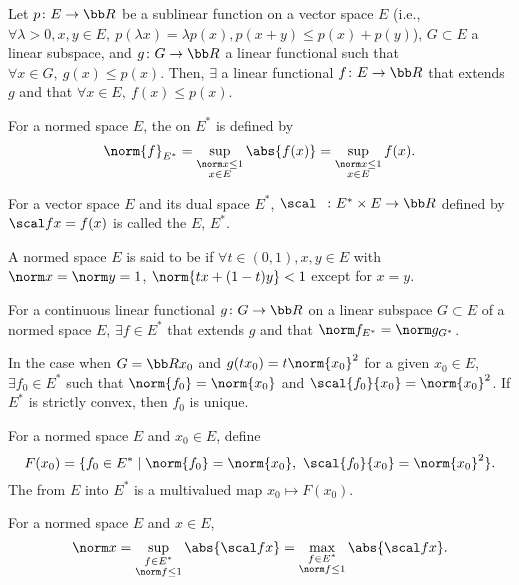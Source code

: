 \cite{brezis}
Let $p \colon E \to \bb R$ be a sublinear function on a vector space $E$ (i.e., $\forall \lambda > 0, x, y \in E,\ p(\lambda x) = \lambda p(x), p(x+y) \le p(x) + p(y)$), $G \subset E$ a linear subspace, and $g \colon G \to \bb R$ a linear functional such that $\forall x \in G,\ g(x) \le p(x)$. Then, $\exists$ a linear functional $f \colon E \to \bb R$ that extends $g$ and that $\forall x \in E,\ f(x) \le p(x)$.

For a normed space $E$, the  on $E^*$ is defined by
\[
  \norm{f}_{E^*} = \sup_{\substack{\norm x \le 1 \\ x \in E}} \abs{f(x)} = \sup_{\substack{\norm x \le 1 \\ x \in E}} f(x).
\]

For a vector space $E$ and its dual space $E^*$, $\scal\ \  \colon E^* \times E \to \bb R$ defined by $\scal fx = f(x)$ is called the  $E$, $E^*$.

A normed space $E$ is said to be  if $\forall t \in (0, 1), x, y \in E$ with $\norm x = \norm y = 1$, $\norm{tx + (1-t)y} < 1$ except for $x = y$.

For a continuous linear functional $g \colon G \to \bb R$ on a linear subspace $G \subset E$ of a normed space $E$, $\exists f \in E^*$ that extends $g$ and that $\norm f_{E^*} = \norm g_{G^*}$.

In the case when $G = \bb R x_0$ and $g(tx_0) = t \norm{x_0}^2$ for a given $x_0 \in E$, $\exists f_0 \in E^*$ such that $\norm{f_0} = \norm{x_0}$ and $\scal{f_0}{x_0} = \norm{x_0}^2$. If $E^*$ is strictly convex, then $f_0$ is unique.

For a normed space $E$ and $x_0 \in E$, define
\[
  F(x_0) = \{ f_0 \in E^* \mid \norm{f_0} = \norm{x_0},\ \scal{f_0}{x_0} = \norm{x_0}^2 \}.
\]
The  from $E$ into $E^*$ is a multivalued map $x_0 \mapsto F(x_0)$.

For a normed space $E$ and $x \in E$,
\[
  \norm x = \sup_{\substack{f \in E^* \\ \norm f \le 1}} \abs{\scal fx} = \max_{\substack{f \in E^* \\ \norm f \le 1}} \abs{\scal fx}.
\]
